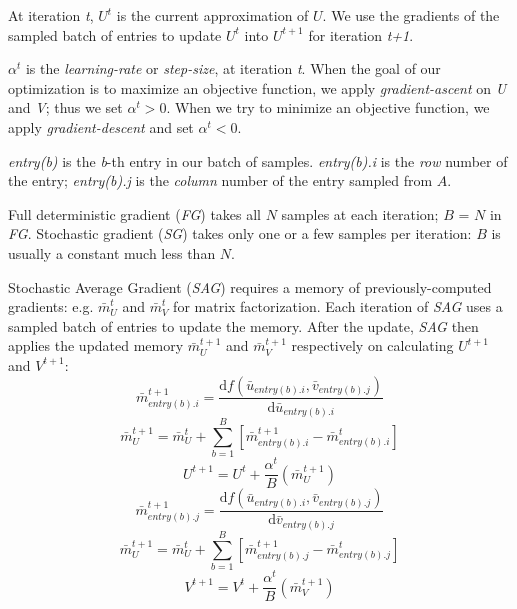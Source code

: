 At iteration \emph{t}, $U^{t}$ is the current approximation of $U$.
We use the gradients of the sampled batch of entries to update $U^{t}$ into $U^{t+1}$ for iteration \emph{t+1}.

$\alpha^{t}$ is the \emph{learning-rate} or \emph{step-size}, at iteration \emph{t}.  
When the goal of our optimization is to maximize an objective function, we apply \emph{gradient-ascent} on \emph{U} and \emph{V}; thus we set $\alpha^{t} > 0$.
When we try to minimize an objective function, we apply \emph{gradient-descent} and set $\alpha^{t} < 0$.

\emph{entry(b)} is the \emph{b}-th entry in our batch of samples.  
\emph{entry(b).i} is the \emph{row} number of the entry; \emph{entry(b).j} is the \emph{column} number of the entry sampled from $A$.

Full deterministic gradient (\emph{FG}) takes all $N$ samples at each iteration;  $B$ = $N$ in \emph{FG}.
Stochastic gradient (\emph{SG}) takes only one or a few samples per iteration: $B$ is usually a constant much less than $N$.


Stochastic Average Gradient (\emph{SAG}) requires a memory of previously-computed gradients: e.g. $\bar{m}_{U}^{t}$ and $\bar{m}_{V}^{t}$ for matrix factorization.
Each iteration of \emph{SAG} uses a sampled batch of entries to update the memory.
After the update, \emph{SAG} then applies the updated memory $\bar{m}_{U}^{t+1}$ and $\bar{m}_{V}^{t+1}$ respectively on calculating $U^{t+1}$ and $V^{t+1}$:
\begin{equation} \label{eq:sag_mi}
  \bar{m}_{entry(b).i}^{t+1} = \frac{\text{d}f(\bar{u}_{entry(b).i}, \bar{v}_{entry(b).j})}{\text{d}\bar{u}_{entry(b).i}}
\end{equation}
\begin{equation} \label{eq:sag_mu}
  \bar{m}_{U}^{t+1} = \bar{m}_{U}^{t} + \sum_{b=1}^{B}\left[\bar{m}_{entry(b).i}^{t+1} - \bar{m}_{entry(b).i}^{t}\right]
\end{equation}
\begin{equation} \label{eq:sag_ut}
  U^{t+1} = U^{t} + \frac{\alpha^{t}}{B}\left(\bar{m}_{U}^{t+1}\right)
\end{equation}
\begin{equation} \label{eq:sag_mj}
  \bar{m}_{entry(b).j}^{t+1} = \frac{\text{d}f(\bar{u}_{entry(b).i}, \bar{v}_{entry(b).j})}{\text{d}\bar{v}_{entry(b).j}}
\end{equation}
\begin{equation} \label{eq:sag_mv}
\bar{m}_{U}^{t+1} = \bar{m}_{U}^{t} + \sum_{b=1}^{B}\left[\bar{m}_{entry(b).j}^{t+1} - \bar{m}_{entry(b).j}^{t}\right]
\end{equation}
\begin{equation} \label{eq:sag_vt}
  V^{t+1} = V^{t} + \frac{\alpha^{t}}{B}\left(\bar{m}_{V}^{t+1}\right)
\end{equation}

